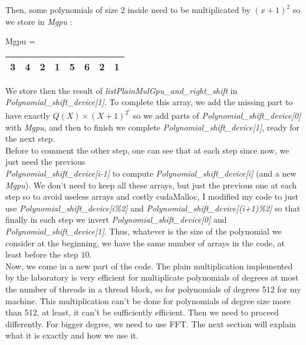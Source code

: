 Then, some polynomials of size 2 inside need to be multiplicated by $(x+1)^2$ so we store in \textit{Mgpu} :\\
\begin{center}
Mgpu = \begin{tabular}{|c|c||c|c||c|c||c|c|}
\hline
3 & 4 & 2 & 1 & 5 & 6 & 2 & 1 \\
\hline
\end{tabular}
\end{center}


We store then the result of \textit{listPlainMulGpu\_and\_right\_shift} in \textit{Polynomial\_shift\_device[1]}. To complete this array, we add the missing part to have exactly $Q(X) \times (X+1)^{2^i}$ so we add parts of \textit{Polynomial\_shift\_device[0]} with \textit{Mgpu}, and then to finish we complete \textit{Polynomial\_shift\_device[1]}, ready for the next step.\\

Before to comment the other step, one can see that at each step since now, we just need the previous\\ \textit{Polynomial\_shift\_device[i-1]} to compute \textit{Polynomial\_shift\_device[i]} (and a new \textit{Mgpu}). We don't need to keep all these arrays, but just the previous one at each step so to avoid useless arrays and costly cudaMalloc, I modified my code to just use \textit{Polynomial\_shift\_device[i\%2]} and \textit{Polynomial\_shift\_device[(i+1)\%2]} so that finally in each step we invert \textit{Polynomial\_shift\_device[0]} and \textit{Polynomial\_shift\_device[1]}. Thus, whatever is the size of the polynomial we consider at the beginning, we have the same number of arrays in the code, at least before the step $10$.\\

Now, we come in a new part of the code. The plain multiplication implemented by the laboratory is very efficient for multiplicate polynomials of degrees at most the number of threads in a thread block, so for polynomials of degrees 512 for my machine. This multiplication can't be done for polynomials of degree size more than 512, at least, it can't be sufficiently efficient. Then we need to proceed differently. For bigger degree, we need to use FFT. The next section will explain what it is exactly and how we use it.
